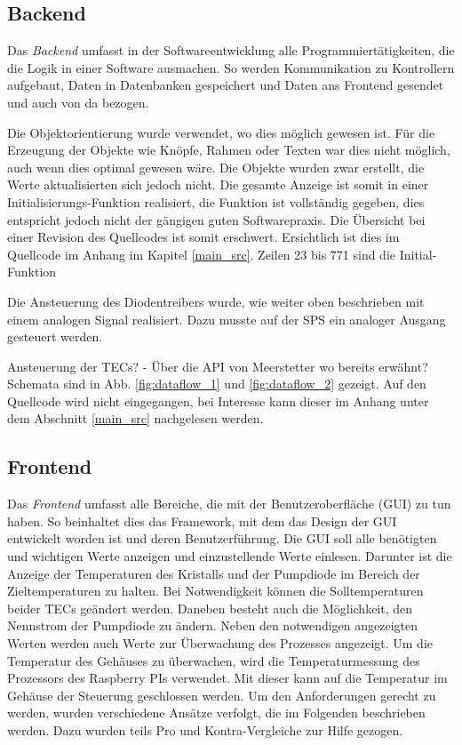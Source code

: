 \subsection{Backend}
\label{chptr:software_backend}
Das \textit{Backend} umfasst in der Softwareentwicklung alle Programmiertätigkeiten, die die Logik in einer Software ausmachen. So werden Kommunikation zu Kontrollern aufgebaut, Daten in Datenbanken gespeichert und Daten ans Frontend gesendet und auch von da bezogen.

Die Objektorientierung wurde verwendet, wo dies möglich gewesen ist. Für die Erzeugung der Objekte wie Knöpfe, Rahmen oder Texten war dies nicht möglich, auch wenn dies optimal gewesen wäre. Die Objekte wurden zwar erstellt, die Werte aktualisierten sich jedoch nicht. Die gesamte Anzeige ist somit in einer Initialisierungs-Funktion realisiert, die Funktion ist vollständig gegeben, dies entspricht jedoch nicht der gängigen guten Softwarepraxis. Die Übersicht bei einer Revision des Quellcodes ist somit erschwert. Ersichtlich ist dies im Quellcode im Anhang im Kapitel \ref{main_src}. Zeilen 23 bis 771 sind die Initial-Funktion

Die Ansteuerung des Diodentreibers wurde, wie weiter oben beschrieben mit einem analogen Signal realisiert. Dazu musste auf der SPS ein analoger Ausgang gesteuert werden.

Ansteuerung der TECs? - Über die API von Meerstetter wo bereits erwähnt?
Schemata sind in Abb. \ref{fig:dataflow_1} und \ref{fig:dataflow_2} gezeigt. Auf den Quellcode wird nicht eingegangen, bei Interesse kann dieser im Anhang unter dem Abschnitt \ref{main_src} nachgelesen werden.

\subsection{Frontend}
Das \textit{Frontend} umfasst alle Bereiche, die mit der Benutzeroberfläche (GUI) zu tun haben. So beinhaltet dies das Framework, mit dem das Design der GUI entwickelt worden ist und deren Benutzerführung. 
Die GUI soll alle benötigten und wichtigen Werte anzeigen und einzustellende Werte einlesen. Darunter ist die Anzeige der Temperaturen des Kristalls und der Pumpdiode im Bereich der Zieltemperaturen zu halten. Bei Notwendigkeit können die Solltemperaturen beider TECs geändert werden. Daneben besteht auch die Möglichkeit, den Nennstrom der Pumpdiode zu ändern. Neben den notwendigen angezeigten Werten werden auch Werte zur Überwachung des Prozesses angezeigt. Um die Temperatur des Gehäuses zu überwachen, wird die Temperaturmessung des Prozessors des Raspberry PIs verwendet. Mit dieser kann auf die Temperatur im Gehäuse der Steuerung geschlossen werden. Um den Anforderungen gerecht zu werden, wurden verschiedene Ansätze verfolgt, die im Folgenden beschrieben werden. Dazu wurden teils Pro und Kontra-Vergleiche zur Hilfe gezogen.\\

